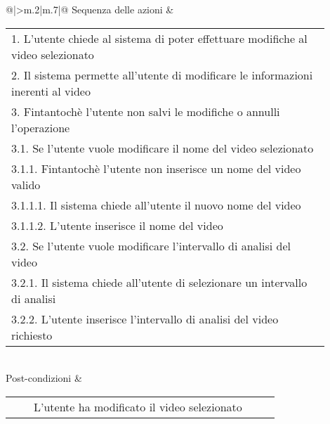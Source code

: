 \begin{table}[H]
\begin{longtable}{@{}|>{\centering\arraybackslash}m{.2\textwidth}|m{.7\textwidth}|@{}}
		Sequenza delle azioni & \begin{tabular}{m{0.9\linewidth}}\hspace{0.0cm}1. L'utente chiede al sistema di poter effettuare modifiche al video selezionato\\\hspace{0.0cm}2. Il sistema permette all'utente di modificare le informazioni inerenti al video\\\hspace{0.0cm}3. Fintantochè l'utente non salvi le modifiche o annulli l'operazione\\\hspace{0.5cm}\hspace{0.0cm}3.1. Se l'utente vuole modificare il nome del video selezionato\\\hspace{1.0cm}\hspace{0.5cm}\hspace{0.0cm}3.1.1. Fintantochè l'utente non inserisce un nome del video valido\\\hspace{1.5cm}\hspace{1.0cm}\hspace{0.5cm}\hspace{0.0cm}3.1.1.1. Il sistema chiede all'utente il nuovo nome del video\\\hspace{1.5cm}\hspace{1.0cm}\hspace{0.5cm}\hspace{0.0cm}3.1.1.2. L'utente inserisce il nome del video\\\hspace{0.5cm}\hspace{0.0cm}3.2. Se l'utente vuole modificare l'intervallo di analisi del video\\\hspace{1.0cm}\hspace{0.5cm}\hspace{0.0cm}3.2.1. Il sistema chiede all'utente di selezionare un intervallo di analisi\\\hspace{1.0cm}\hspace{0.5cm}\hspace{0.0cm}3.2.2. L'utente inserisce l'intervallo di analisi del video richiesto\\\end{tabular}\\
		Post-condizioni & \begin{tabular}{m{0.9\linewidth}}~~\llap{\textbullet}~~L'utente ha modificato il video selezionato\\\end{tabular}\\

\end{longtable}
\end{table}
